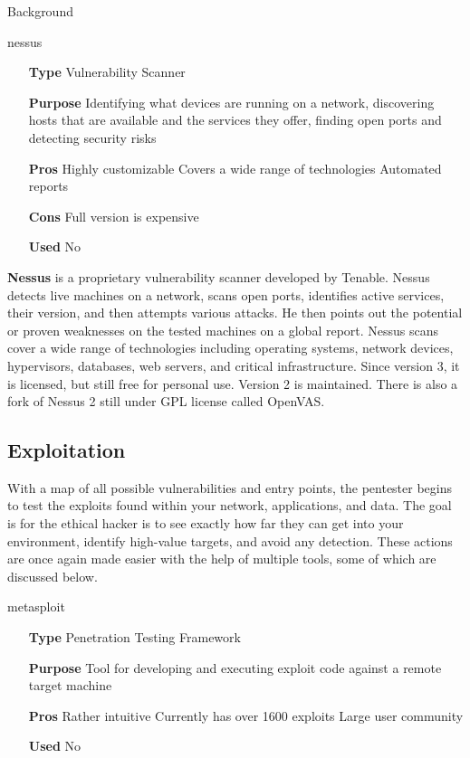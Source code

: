 \begin{chaptercover}{Background}
\begin{solutiondata}{nessus}
\begin{itemize}[labelsep=1cm]
  \item [\textbf{Type}] Vulnerability Scanner
  \item [\textbf{Purpose}] Identifying what devices are running on a network, discovering hosts that are available and the services they offer, finding open ports and detecting security risks
  \item [\textbf{Pros}] Highly customizable \newline Covers a wide range of technologies \newline Automated reports
  \item [\textbf{Cons}] Full version is expensive
  \item [\textbf{Used}] No
\end{itemize}
\end{solutiondata}

\textbf{Nessus} \cite{Nessus} is a proprietary vulnerability scanner developed by Tenable. Nessus detects live machines on a network, scans open ports, identifies active services, their version, and then attempts various attacks. He then points out the potential or proven weaknesses on the tested machines on a global report. Nessus scans cover a wide range of technologies including operating systems, network devices, hypervisors, databases, web servers, and critical infrastructure. Since version 3, it is licensed, but still free for personal use. Version 2 is maintained. There is also a fork of Nessus 2 still under GPL license called OpenVAS.

\subsection{Exploitation}

With a map of all possible vulnerabilities and entry points, the pentester begins to test the exploits found within your network, applications, and data. The goal is for the ethical hacker is to see exactly how far they can get into your environment, identify high-value targets, and avoid any detection. These actions are once again made easier with the help of multiple tools, some of which are discussed below.

\begin{solutiondata}{metasploit}
\begin{itemize}[labelsep=1cm]
  \item [\textbf{Type}] Penetration Testing Framework
  \item [\textbf{Purpose}] Tool for developing and executing exploit code against a remote target machine
  \item [\textbf{Pros}] Rather intuitive \newline Currently has over 1600 exploits \newline Large user community
  \item [\textbf{Used}] No
\end{itemize}
\end{solutiondata}


\end{chaptercover}
